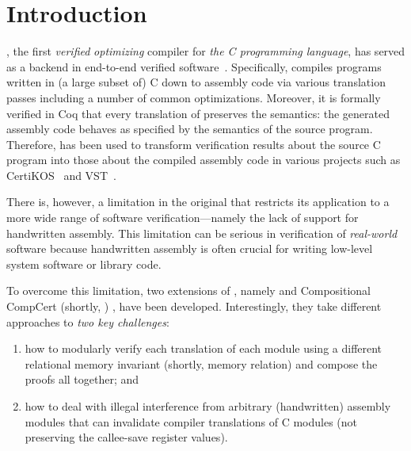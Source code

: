 \chapter{\;\;\;\;Introduction}\label{sec:introduction}


\cc{} \cite{CompCert, Compcert-CACM}, the first \emph{verified}
\emph{optimizing} compiler for \emph{the C programming language}, has
served as a backend in end-to-end verified
software~\cite{appel2014program}. Specifically, \cc{} compiles programs written in (a
large subset of) C down to assembly code via various translation
passes including a number of common optimizations.  Moreover, it is
formally verified in Coq that every translation of \cc{} preserves the
semantics: the generated assembly code behaves as specified by the
semantics of the source program. Therefore, \cc{} has been used to
transform verification results about the source C program into those
about the compiled assembly code in various projects such as
CertiKOS~\cite{CertiKOS11, CertiKOS16} and VST~\cite{VST}.

There is, however, a limitation in the original \cc{} that restricts
its application to a more wide range of software verification---namely
the lack of support for handwritten assembly. This
limitation can be serious in verification of \emph{real-world}
software because handwritten assembly is often crucial for writing
low-level system software or library code.

To overcome this limitation, two extensions of \cc{}, namely \ccx{}
\cite{gu:dscal,wang:saccx} and Compositional CompCert (shortly, \ccc{}) \cite{beringer:isem,stewart:ccc}, have
been developed. Interestingly, they take different approaches to
\emph{two key challenges}:
\begin{enumerate}
\item how to modularly verify each translation of each
module using a different relational memory invariant (shortly, memory relation) and compose the proofs all
together; and
\item how to deal with illegal interference from
arbitrary (handwritten) assembly modules that can invalidate compiler
translations of C modules (\eg not preserving the
callee-save register values).
\end{enumerate}

